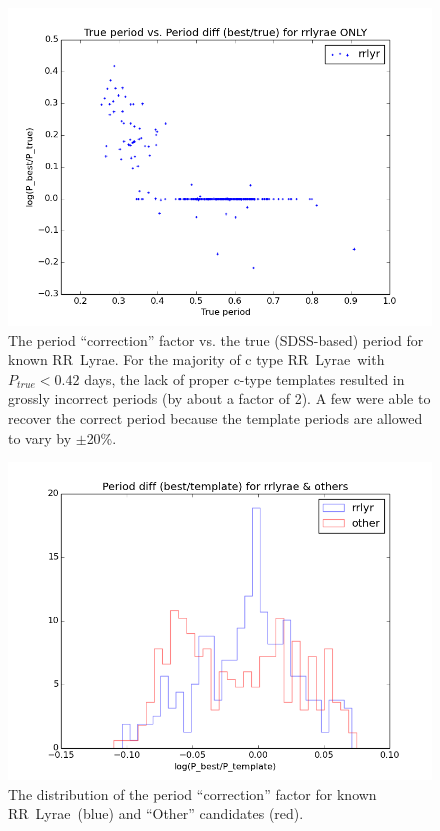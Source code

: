 \documentclass[12pt, preprint]{aastex}
\def\RR  {\hbox{RR Lyrae}}
\begin{document}
\begin{figure}[!t]
\hskip 0.4in
\includegraphics[width=0.9\hsize,clip]{PratPtrue.png}
\caption{The period ``correction'' factor vs. the true (SDSS-based) period for known \RR. For the
majority of c type \RR\ with $P_{true} <0.42$ days, the lack of proper c-type  templates resulted in
grossly incorrect periods (by about a factor of 2). A few were able to recover the correct period 
because the template periods are allowed to vary by $\pm$20\%.} 
\label{Fig:PratPtrue}
\end{figure}


\begin{figure}[!t]
\hskip 0.4in
\includegraphics[width=0.9\hsize,clip]{Prat.png}
\caption{The distribution of the period ``correction'' factor for known \RR\ (blue) and ``Other'' candidates (red).} 
\label{Fig:Prat}
\end{figure}
\end{document}

